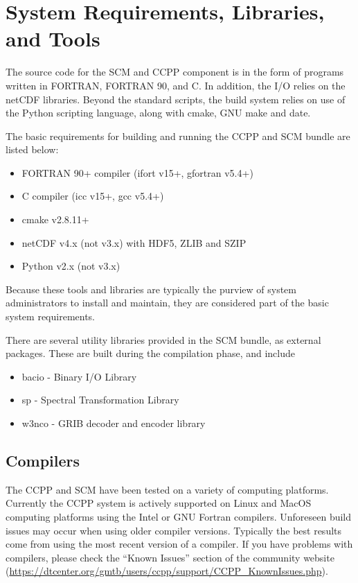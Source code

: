 \section{System Requirements, Libraries, and Tools}
\label{section: systemrequirements}

The source code for the SCM and CCPP component is in the form of programs written in FORTRAN, FORTRAN 90, and C. In addition, the I/O relies on the netCDF libraries. Beyond the standard scripts, the build system relies on use of the Python scripting language, along with cmake, GNU make and date.

The basic requirements for building and running the CCPP and SCM bundle are listed below:
\begin{itemize}
    \item FORTRAN 90+ compiler (ifort v15+, gfortran v5.4+)
    \item C compiler (icc v15+, gcc v5.4+)
    \item cmake v2.8.11+
    \item netCDF v4.x (not v3.x) with HDF5, ZLIB and SZIP
    \item Python v2.x (not v3.x)
\end{itemize}

Because these tools and libraries are typically the purview of system administrators to install and maintain, they are considered  part of the basic system requirements.

There are several utility libraries provided in the SCM bundle, as external packages. These are built during the compilation phase, and include
\begin{itemize}
    \item bacio - Binary I/O Library
    \item sp - Spectral Transformation Library
    \item w3nco - GRIB decoder and encoder library
\end{itemize}

\subsection{Compilers}
The CCPP and SCM have been tested on a variety of
computing platforms. Currently the CCPP system is actively supported
on Linux and MacOS computing platforms using the Intel or GNU Fortran
compilers. Unforeseen build issues may occur when using older
compiler versions. Typically the best results come from using the
most recent version of a compiler. If you have problems with compilers, please check the ``Known Issues'' section of the
community website (\url{https://dtcenter.org/gmtb/users/ccpp/support/CCPP_KnownIssues.php}).

